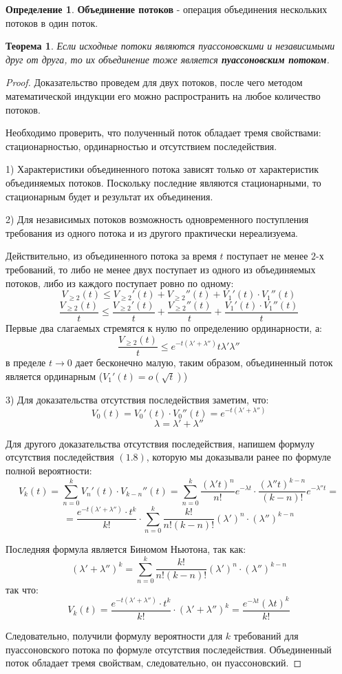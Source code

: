 \documentclass[aps,%
12pt,%
final,%
oneside,
onecolumn,%
musixtex, %
superscriptaddress,%
centertags]{article} %
\theoremstyle{plain}
\newtheorem{theorem}{Теорема}[section] %
\theoremstyle{definition}
\newtheorem{definition}{Определение}[subsection]
\theoremstyle{remark}
\begin{document}
\begin{definition}
	\textbf{Объединение потоков} - операция объединения нескольких потоков в один поток.
\end{definition}
\begin{theorem}
	Если исходные потоки являются \textit{пуассоновскими} и \textit{независимыми} друг от друга, то их объединение тоже является \textbf{пуассоновским потоком}.
\end{theorem}
\begin{proof}
	Доказательство проведем для двух потоков, после чего методом математической индукции его можно распространить на любое количество потоков.

	Необходимо проверить, что полученный поток обладает тремя свойствами: стационарностью, ординарностью и отсутствием последействия.

	1) Характеристики объединенного потока зависят только от характеристик объединяемых потоков. Поскольку последние являются стационарными, то стационарным будет и результат их объединения.

	2) Для независимых потоков возможность одновременного поступления требования из одного потока и из другого практически нереализуема.

	Действительно, из объединенного потока за время $t$ поступает не менее $2$-х требований, то либо не менее двух поступает из одного из объединяемых потоков, либо из каждого поступает ровно по одному:
	$$V_{\geq 2}(t) \leq V_{\geq 2}'(t) + V_{\geq 2}''(t) + V_1'(t)\cdot V_1''(t)$$
	$$\frac{V_{\geq 2}(t)}{t} \leq \frac{V_{\geq 2}'(t)}{t} + \frac{V_{\geq 2}''(t)}{t} + \frac{V_1'(t)\cdot V_1''(t)}{t}$$Первые два слагаемых стремятся к нулю по определению ординарности, а:
	$$\frac{V_{\geq 2}(t)}{t} \leq e^{-t(\lambda' + \lambda'')}t \lambda'\lambda''$$
	в пределе $t \to 0$ дает бесконечно малую, таким образом, объединенный поток является ординарным ($V_1'(t) = o(\sqrt{t})$)

	3) Для доказательства отсутствия последействия заметим, что:
	$$V_0(t) = V_0'(t)\cdot V_0''(t) = e^{-t(\lambda' + \lambda'')}$$
	$$\lambda =  \lambda' + \lambda''$$

	Для другого доказательства отсутствия последействия, напишем формулу отсутствия последействия $(1.8)$, которую мы доказывали ранее по формуле полной вероятности:
	$$V_k(t) = \sum\limits_{n=0}^k V_n'(t) \cdot V_{k-n}''(t) = \sum\limits_{n=0}^k \frac{(\lambda't)^n}{n!}e^{-\lambda t} \cdot \frac{(\lambda'' t)^{k-n}}{(k-n)!}e^{-\lambda'' t} =$$
	$$ =  \frac{e^{-t(\lambda'+\lambda'')} \cdot t^k}{k!} \cdot \sum\limits_{n=0}^k \frac{k!}{n!(k-n)!}(\lambda')^n\cdot (\lambda'')^{k-n}$$

	Последняя формула является Биномом Ньютона, так как:
	$$(\lambda'+\lambda'')^k = \sum\limits_{n=0}^k \frac{k!}{n!(k-n)!}(\lambda')^n\cdot (\lambda'')^{k-n}$$
	так что:
	$$V_k(t) = \frac{e^{-t(\lambda'+\lambda'')} \cdot t^k}{k!} \cdot (\lambda'+\lambda'')^k = \frac{e^{-\lambda t}(\lambda t)^k}{k!}$$

	Следовательно, получили формулу вероятности для $k$ требований для пуассоновского потока по формуле отсутствия последействия. Объединенный поток обладает тремя свойствам, следовательно, он пуассоновский.
\end{proof}
\end{document}
